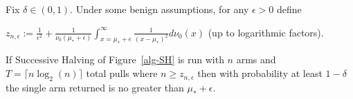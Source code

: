 





\begin{conjecture}\label{conjecture:main}
Fix $\delta \in (0,1)$. Under some benign assumptions, for any $\epsilon >0$ define

$z_{n,\epsilon}:= \frac{1}{\epsilon^2} + \frac{1}{\nu_0(\mu_* + \epsilon)}\int_{x = \mu_* + \epsilon}^\infty  \frac{1}{(x-\mu_*)^{2}}  d\nu_0(x)$ (up to logarithmic factors).


If Successive Halving of Figure~\ref{alg-SH} is run with $n$ arms and $T=\lceil n \log_2(n) \rceil$ total pulls where $n \geq z_{n,\epsilon}$ then with probability at least $1-\delta$ the single arm returned is no greater than $\mu_* +\epsilon$.
\end{conjecture}

